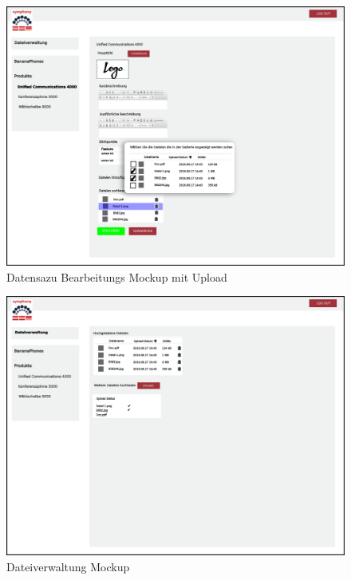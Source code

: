 \documentclass[a4paper,12pt]{article}
\begin{document}
\begin{figure}[!htb]
  \centering
     \includegraphics[width=1.0\textwidth]{projmicro_edit_dateiauswahl.png}
  \caption{Datensazu Bearbeitungs Mockup mit Upload}
  \label{fig:edit_file}
\end{figure}

\begin{figure}[!htb]
  \centering
     \includegraphics[width=1.0\textwidth]{projmicro_upload.png}
  \caption{Dateiverwaltung Mockup}
  \label{fig:selection}
\end{figure}
\end{document}
